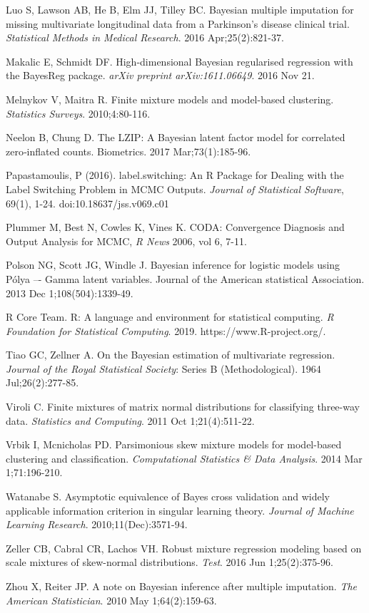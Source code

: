 \documentclass[useAMS,referee]{biom}
\begin{document}
\begin{thebibliography}{}
\bibitem{ } Luo S, Lawson AB, He B, Elm JJ, Tilley BC. Bayesian multiple imputation for missing multivariate longitudinal data from a Parkinson's disease clinical trial. \textit{Statistical Methods in Medical Research}. 2016 Apr;25(2):821-37.

\bibitem{ } Makalic E, Schmidt DF. High-dimensional Bayesian regularised regression with the BayesReg package. \textit{arXiv preprint arXiv:1611.06649}. 2016 Nov 21.

\bibitem{ } Melnykov V, Maitra R. Finite mixture models and model-based clustering. \textit{Statistics Surveys}. 2010;4:80-116.

\bibitem{ } Neelon B, Chung D. The LZIP: A Bayesian latent factor model for correlated zero‐inflated counts. Biometrics. 2017 Mar;73(1):185-96.

\bibitem{ } Papastamoulis, P (2016). label.switching: An R Package for Dealing with the Label Switching Problem in MCMC Outputs. \textit{Journal of Statistical Software}, 69(1), 1-24. doi:10.18637/jss.v069.c01

\bibitem{} Plummer M, Best N, Cowles K, Vines K. CODA: Convergence Diagnosis and Output Analysis for MCMC, \textit{R News} 2006, vol 6, 7-11.

\bibitem{ } Polson NG, Scott JG, Windle J. Bayesian inference for logistic models using P\'olya –- Gamma latent variables. Journal of the American statistical Association. 2013 Dec 1;108(504):1339-49.

\bibitem{ } R Core Team. R: A language and environment for statistical computing. \textit{R Foundation for Statistical Computing}. 2019. https://www.R-project.org/.

\bibitem{ } Tiao GC, Zellner A. On the Bayesian estimation of multivariate regression. \textit{Journal of the Royal Statistical Society}: Series B (Methodological). 1964 Jul;26(2):277-85.

\bibitem{ } Viroli C. Finite mixtures of matrix normal distributions for classifying three-way data. \textit{Statistics and Computing}. 2011 Oct 1;21(4):511-22.

\bibitem{ } Vrbik I, Mcnicholas PD. Parsimonious skew mixture models for model-based clustering and classification. \textit{Computational Statistics \& Data Analysis}. 2014 Mar 1;71:196-210.

\bibitem{ } Watanabe S. Asymptotic equivalence of Bayes cross validation and widely applicable information criterion in singular learning theory. \textit{Journal of Machine Learning Research}. 2010;11(Dec):3571-94.

\bibitem{ } Zeller CB, Cabral CR, Lachos VH. Robust mixture regression modeling based on scale mixtures of skew-normal distributions. \textit{Test}. 2016 Jun 1;25(2):375-96.

\bibitem{ } Zhou X, Reiter JP. A note on Bayesian inference after multiple imputation. \textit{The American Statistician}. 2010 May 1;64(2):159-63.

\end{thebibliography}
\end{document}
